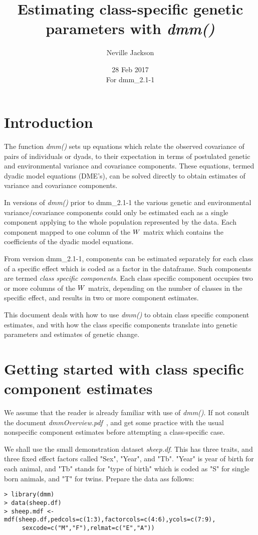 \documentclass[titlepage]{article}  %
\title{ Estimating class-specific genetic parameters with {\em dmm()}}
\author{Neville Jackson }
\date{28 Feb 2017 \\
      For dmm\_2.1-1}   %
\begin{document}
 
 
\maketitle      
\tableofcontents

\section{Introduction} 
The function {\em dmm()} sets up equations which relate the observed covariance of pairs of individuals or dyads, to their expectation in terms of postulated genetic and environmental variance and covariance components.  These equations, termed dyadic model equations (DME's), can be solved directly to obtain estimates of variance and covariance components.  

In versions of {\em dmm()} prior to dmm\_2.1-1 the various genetic and environmental variance/covariance components could only be estimated each as a single component applying to the whole population represented by the data. Each component mapped to one column of the $\boldmath W$ matrix which contains the coefficients of the dyadic model equations.

From version dmm\_2.1-1, components can be estimated separately for each class of a specific effect which is coded as a factor in the dataframe. Such components are termed {\em class specific components}. Each class specific component occupies two or more columns of the $\boldmath W$ matrix, depending on the number of classes in the specific effect, and results in two or more component estimates.

This document deals with how to use {\em dmm()} to obtain class specific component estimates, and with how the class specific components translate into genetic parameters and estimates of genetic change.


 
\section{Getting started with class specific component estimates}
\label{sec:getstart}
 We assume that the reader is already familiar with use of {\em dmm()}. If not consult the document {\em dmmOverview.pdf}~\cite{jack:15}, and get some practice with the usual nonspecific component estimates before attempting a class-specific case.

 We shall use the small demonstration dataset {\em sheep.df}. This has three traits, and three fixed effect factors called "Sex", "Year", and "Tb". "Year" is year of birth for each animal, and "Tb" stands for "type of birth" which is coded as "S" for single born animals, and "T" for twins.  Prepare the data ass follows:
\begin{verbatim}
> library(dmm)
> data(sheep.df)
> sheep.mdf <- mdf(sheep.df,pedcols=c(1:3),factorcols=c(4:6),ycols=c(7:9),
     sexcode=c("M","F"),relmat=c("E","A"))
\end{verbatim}
\end{document}
